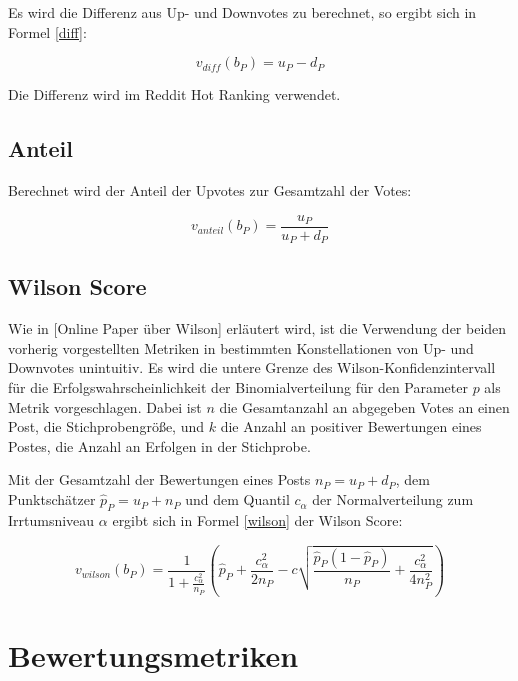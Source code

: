 Es wird die Differenz aus Up- und Downvotes zu berechnet, so ergibt sich in Formel \ref{diff}:

\begin{equation}
\label{diff}
v_{diff}(b_P) = u_P - d_P
\end{equation}

Die Differenz wird im Reddit Hot Ranking verwendet.

\subsection{Anteil}

Berechnet wird der Anteil der Upvotes zur Gesamtzahl der Votes:

\begin{equation}
\label{anteil}
v_{anteil}(b_P) = \frac{u_P}{u_P + d_P}
\end{equation}


\subsection{Wilson Score}

Wie in [Online Paper über Wilson] erläutert wird, ist die Verwendung der beiden vorherig vorgestellten Metriken in bestimmten Konstellationen von Up- und Downvotes unintuitiv. Es wird  die untere Grenze des Wilson-Konfidenzintervall für die Erfolgswahrscheinlichkeit der Binomialverteilung für den Parameter $p$ als Metrik vorgeschlagen. Dabei ist $n$ die Gesamtanzahl an abgegeben Votes an einen Post, die Stichprobengröße, und $k$ die Anzahl an positiver Bewertungen eines Postes, die Anzahl an Erfolgen in der Stichprobe.
	
Mit der Gesamtzahl der Bewertungen eines Posts $n_P = u_P + d_P$, dem Punktschätzer $\hat{p}_P = u_P + n_P$ und dem Quantil $c_{\alpha}$ der Normalverteilung zum Irrtumsniveau $\alpha$ ergibt sich in Formel \ref{wilson} der Wilson Score:

\begin{equation}
\label{wilson}
 v_{wilson}(b_P) = \frac{1}{1+\frac{c_{\alpha}^2}{n_P}}(\hat{p}_P + \frac{c_{\alpha}^2}{2n_P} - c \sqrt{\frac{\hat{p}_P(1 - \hat{p}_P)}{n_P} + \frac{c_{\alpha}^2}{4n_P^2}})
\end{equation}
	
\section{Bewertungsmetriken}

